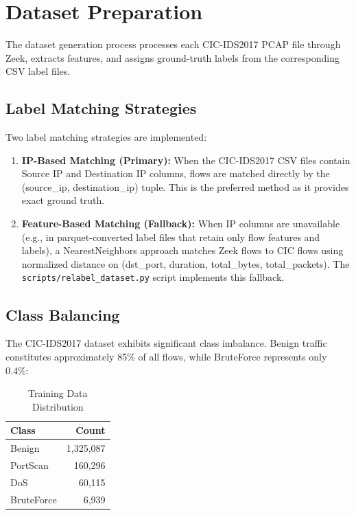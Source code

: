 \documentclass[12pt,a4paper,twoside]{report}
\begin{document}
\section{Dataset Preparation}

The dataset generation process processes each CIC-IDS2017 PCAP file through Zeek, extracts features, and assigns ground-truth labels from the corresponding CSV label files.

\subsection{Label Matching Strategies}

Two label matching strategies are implemented:

\begin{enumerate}[leftmargin=*]
    \item \textbf{IP-Based Matching (Primary):} When the CIC-IDS2017 CSV files contain Source IP and Destination IP columns, flows are matched directly by the (source\_ip, destination\_ip) tuple. This is the preferred method as it provides exact ground truth.
    \item \textbf{Feature-Based Matching (Fallback):} When IP columns are unavailable (e.g., in parquet-converted label files that retain only flow features and labels), a NearestNeighbors approach matches Zeek flows to CIC flows using normalized distance on (dst\_port, duration, total\_bytes, total\_packets). The \texttt{scripts/relabel\_dataset.py} script implements this fallback.
\end{enumerate}

\subsection{Class Balancing}

The CIC-IDS2017 dataset exhibits significant class imbalance. Benign traffic constitutes approximately 85\% of all flows, while BruteForce represents only 0.4\%:

\begin{table}[H]
\centering
\caption{Training Data Distribution}
\begin{tabularx}{\textwidth}{lr}
\toprule
\textbf{Class} & \textbf{Count} \\
\midrule
Benign & 1,325,087 \\
PortScan & 160,296 \\
DoS & 60,115 \\
BruteForce & 6,939 \\
\bottomrule
\end{tabularx}
\end{table}
\end{document}
